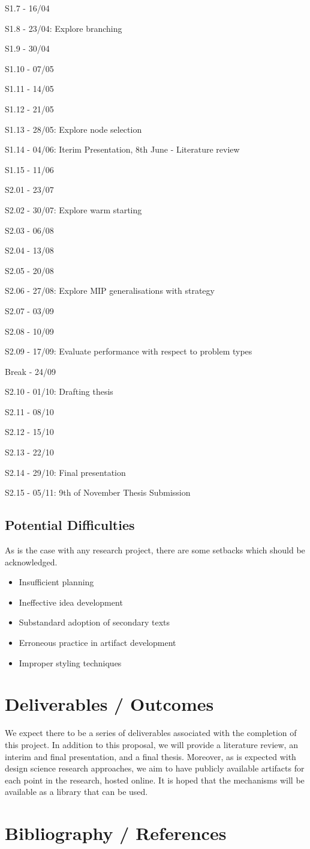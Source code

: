 \documentclass[12pt, a4paper]{article}
\begin{document}
S1.7  - 16/04

S1.8  - 23/04: Explore branching

S1.9  - 30/04

S1.10 - 07/05

S1.11 - 14/05

S1.12 - 21/05

S1.13 - 28/05: Explore node selection

S1.14 - 04/06: Iterim Presentation, 8th June - Literature review

S1.15 - 11/06

S2.01 - 23/07

S2.02 - 30/07: Explore warm starting

S2.03 - 06/08

S2.04 - 13/08

S2.05 - 20/08

S2.06 - 27/08: Explore MIP generalisations with strategy

S2.07 - 03/09

S2.08 - 10/09

S2.09 - 17/09: Evaluate performance with respect to problem types

Break - 24/09

S2.10 - 01/10: Drafting thesis

S2.11 - 08/10

S2.12 - 15/10

S2.13 - 22/10

S2.14 - 29/10: Final presentation

S2.15 - 05/11: 9th of November Thesis Submission

\subsection{Potential Difficulties}
As is the case with any research project, there are some setbacks which should be acknowledged.
\begin{itemize}
  \item Insufficient planning
  \item Ineffective idea development
  \item Substandard adoption of secondary texts
  \item Erroneous practice in artifact development
  \item Improper styling techniques
\end{itemize}

\section{Deliverables / Outcomes}
We expect there to be a series of deliverables associated with the completion of this project. In addition to this proposal, we will provide a literature review, an interim and final presentation, and a final thesis. Moreover, as is expected with design science research approaches, we aim to have publicly available artifacts for each point in the research, hosted online. It is hoped that the mechanisms will be available as a library that can be used.

\section{Bibliography / References}


\end{document}
